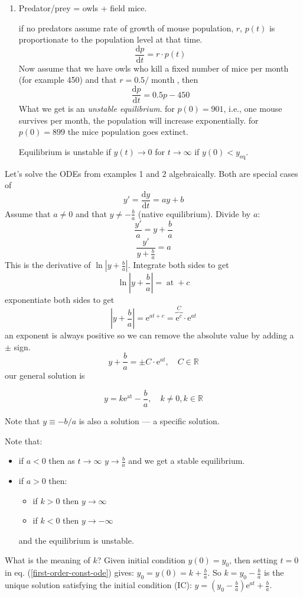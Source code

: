 \documentclass{article}
\newcommand{\mathd}{\mathrm{d}}
\newcommand{\mathe}{\mathrm{e}}
\newcommand{\nospace}{}
\newcommand{\tmem}[1]{{\em #1\/}}
\newcommand{\tmop}[1]{\ensuremath{\operatorname{#1}}}
\newenvironment{itemizedot}{\begin{itemize} \renewcommand{\labelitemi}{$\bullet$}\renewcommand{\labelitemii}{$\bullet$}\renewcommand{\labelitemiii}{$\bullet$}\renewcommand{\labelitemiv}{$\bullet$}}{\end{itemize}}
\newenvironment{itemizeminus}{\begin{itemize} \renewcommand{\labelitemi}{$-$}\renewcommand{\labelitemii}{$-$}\renewcommand{\labelitemiii}{$-$}\renewcommand{\labelitemiv}{$-$}}{\end{itemize}}
\begin{document}
\begin{enumerate}
  \item Predator/prey = owls + field mice.
  
  if no predators assume rate of growth of mouse population, $r$, $p (t)$ is
  proportionate to the population level at that time.
  \[ \frac{\mathd p}{\mathd t} = r \cdot p (t) \]
  Now assume that we have owls who kill a fixed number of mice per month (for
  example 450) and that $r = 0.5 / \tmop{month}$, then
  \[ \frac{\mathd p}{\mathd t} = 0.5 p - 450 \]
  What we get is an {\tmem{unstable equilibrium}}. for $p (0) = 901$, i.e.,
  one mouse survives per month, the population will increase exponentially.
  for $p (0) = 899$ the mice population goes extinct.
  
  Equilibrium is unstable if $y (t) \rightarrow 0$ for $t \rightarrow \infty$
  if $y (0) < y_{\tmop{eq}}$.
\end{enumerate}
Let's solve the ODEs from examples 1 and 2 algebraically. Both are special
cases of
\[ y' = \frac{\mathd y}{\mathd t} = ay + b \]
Assume that $a \neq 0$ and that $y \neq - \frac{b}{a}$ (native equilibrium).
Divide by $a$:
\[ \frac{y'}{a} = y + \frac{b}{a} \]
\[ \frac{y'}{y + \frac{b}{a}} = a \]
This is the derivative of $\ln \left| y + \frac{b}{a} \right|$. Integrate both
sides to get
\[ \ln \left| y + \frac{b}{a} \right| = \tmop{at} + c \]
exponentiate both sides to get
\[ \left| y + \frac{b}{a} \right| = \mathe^{at + c} = \overbrace{\mathe^c}^C
   \cdot \mathe^{at} \]
an exponent is always positive so we can remove the absolute value by adding a
$\pm$ sign.
\[ y + \frac{b}{a} = \pm C \cdot \mathe^{at}, \quad C \in \mathbb{R} \]
our general solution is

\begin{tmornamented}
  \begin{equation}
    y = k \mathe^{\tmop{at}} - \frac{b}{a}, \quad k \neq 0, \nospace k \in
    \mathbb{R} \label{first-order-const-ode}
  \end{equation}
\end{tmornamented}

Note that $y \equiv - b / a$ is also a solution --- a specific solution.

Note that:
\begin{itemizedot}
  \item  if $a < 0$ then as $t \rightarrow \infty$ $y \rightarrow \frac{b}{a}$
  and we get a stable equilibrium.
  
  \item if $a > 0$ then:
  \begin{itemizeminus}
    \item if $k > 0$ then $y \rightarrow \infty$
    
    \item if $k < 0$ then $y \rightarrow - \infty$
  \end{itemizeminus}
  and the equilibrium is unstable.
\end{itemizedot}
What is the meaning of $k$? Given initial condition $y (0) = y_0$, then
setting $t = 0$ in eq. (\ref{first-order-const-ode}) gives: $y_0 = y (0) = k +
\frac{b}{a}$. So $k = y_0 - \frac{b}{a}$ is the unique solution satisfying the
initial condition (IC): $y = \left( y_0 - \frac{b}{a} \right) \mathe^{at} +
\frac{b}{a}$.
\end{document}
